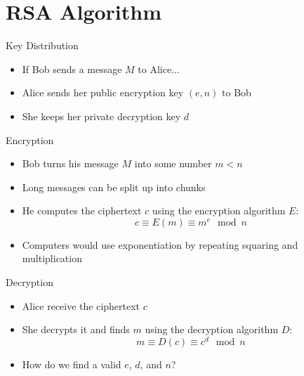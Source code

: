 \documentclass[handout, aspectratio=169]{beamer}
\begin{document}
\section{RSA Algorithm}
\frame{\sectionpage}

\begin{frame}{Key Distribution}
    \begin{itemize}
        \item If Bob sends a message $M$ to Alice...
        \item Alice sends her public encryption key $(e, n)$ to Bob
        \item She keeps her private decryption key $d$
    \end{itemize}
\end{frame}

\begin{frame}{Encryption}
    \begin{itemize}
        \item Bob turns his message $M$ into some number $m < n$
        \item Long messages can be split up into chunks
        \item He computes the ciphertext $c$ using the encryption algorithm $E$:
        \begin{equation*}
            c \equiv E(m) \equiv m^e \mod n
        \end{equation*}
        \item Computers would use exponentiation by repeating squaring and multiplication
    \end{itemize}
\end{frame}


\begin{frame}{Decryption}
    \begin{itemize}
        \item Alice receive the ciphertext $c$
        \item She decrypts it and finds $m$ using the decryption algorithm $D$:
        \begin{equation*}
            m \equiv D(c) \equiv c^d \mod n
        \end{equation*}
        \item How do we find a valid $e$, $d$, and $n$?
    \end{itemize}
\end{frame}
\end{document}
